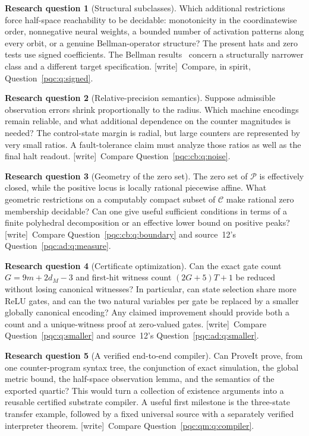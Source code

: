 \documentclass[11pt,letterpaper]{article}
\numberwithin{equation}{section}
\theoremstyle{definition}
\newtheorem{question}{Research question}
\theoremstyle{remark}
\newcommand{\wtag}{\textup{[write]}}
\newcommand{\Cone}{\mathcal C}
\newcommand{\Peak}{\mathcal P}
\begin{document}
\begin{question}[Structural subclasses]
Which additional restrictions force half-space reachability to be
decidable: monotonicity in the coordinatewise order, nonnegative neural
weights, a bounded number of activation patterns along every orbit,
or a genuine Bellman-operator structure? The present hats and zero tests
use signed coefficients. The Bellman results~\cite{b62s14-bellman} concern a
structurally narrower class and a different target specification.
\wtag\ Compare, in spirit, Question~\ref{pqc:q:signed}.
\end{question}

\begin{question}[Relative-precision semantics]
Suppose admissible observation errors shrink proportionally to the radius.
Which machine encodings remain reliable, and what additional dependence on
the counter magnitudes is needed? The control-state margin is radial, but
large counters are represented by very small ratios. A fault-tolerance
claim must analyze those ratios as well as the final halt readout.
\wtag\ Compare Question~\ref{pqc:cb:q:noise}.
\end{question}

\begin{question}[Geometry of the zero set]\label{pqc:sc:q:zeroset}
The zero set of $\Peak$ is effectively closed, while the positive locus is
locally rational piecewise affine. What geometric restrictions on a
computably compact subset of $\Cone$ make rational zero membership
decidable? Can one give useful sufficient conditions in terms of a finite
polyhedral decomposition or an effective lower bound on positive peaks?
\wtag\ Compare Question~\ref{pqc:cb:q:boundary} and source~12's Question~\ref{pqc:ad:q:measure}.
\end{question}

\begin{question}[Certificate optimization]
Can the exact gate count $G=9m+2d_M-3$ and first-hit witness count
$(2G+5)T+1$ be reduced without losing canonical witnesses? In particular,
can state selection share more ReLU gates, and can the two natural variables
per gate be replaced by a smaller globally canonical encoding? Any claimed
improvement should provide both a count and a unique-witness proof at
zero-valued gates.
\wtag\ Compare Question~\ref{pqc:q:smaller} and source~12's Question~\ref{pqc:ad:q:smaller}.
\end{question}

\begin{question}[A verified end-to-end compiler]
Can ProveIt prove, from one counter-program syntax tree, the conjunction of
exact simulation, the global metric bound, the half-space observation lemma,
and the semantics of the exported quartic? This would turn a collection of
existence arguments into a reusable certified substrate compiler. A useful
first milestone is the three-state transfer example, followed by a fixed
universal source with a separately verified interpreter theorem.
\wtag\ Compare Question~\ref{pqc:qm:q:compiler}.
\end{question}
\end{document}
